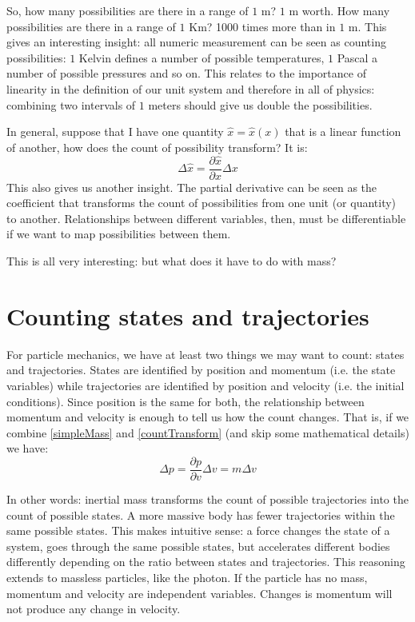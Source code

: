 \documentclass[aps,pra,10pt,floatfix,nofootinbib]{revtex4-1}
\theoremstyle{definition}
\begin{document}
So, how many possibilities are there in a range of $1$ m? $1$ m worth. How many possibilities are there in a range of $1$ Km? 1000 times more than in $1$ m. This gives an interesting insight: all numeric measurement can be seen as counting possibilities: $1$ Kelvin defines a number of possible temperatures, $1$ Pascal a number of possible pressures and so on. This relates to the importance of linearity in the definition of our unit system and therefore in all of physics: combining two intervals of $1$ meters should give us double the possibilities.

In general, suppose that I have one quantity $\hat{x}=\hat{x}(x)$ that is a linear function of another, how does the count of possibility transform? It is:
\begin{equation}
\label{countTransform}
\Delta \hat{x} = \frac{\partial \hat{x}}{\partial x} \Delta x
\end{equation}
This also gives us another insight. The partial derivative can be seen as the coefficient that transforms the count of possibilities from one unit (or quantity) to another. Relationships between different variables, then, must be differentiable if we want to map possibilities between them.

This is all very interesting: but what does it have to do with mass?

\section{Counting states and trajectories}

For particle mechanics, we have at least two things we may want to count: states and trajectories. States are identified by position and momentum (i.e. the state variables) while trajectories are identified by position and velocity (i.e. the initial conditions). Since position is the same for both, the relationship between momentum and velocity is enough to tell us how the count changes. That is, if we combine \eqref{simpleMass} and \eqref{countTransform} (and skip some mathematical details) we have:
\begin{equation}
\label{stateCountTransform}
\Delta p = \frac{\partial p}{\partial v} \Delta v = m \Delta v
\end{equation}

In other words: inertial mass transforms the count of possible trajectories into the count of possible states. A more massive body has fewer trajectories within the same possible states. This makes intuitive sense: a force changes the state of a system, goes through the same possible states, but accelerates different bodies differently depending on the ratio between states and trajectories. This reasoning extends to massless particles, like the photon. If the particle has no mass, momentum and velocity are independent variables. Changes is momentum will not produce any change in velocity.
\end{document}
